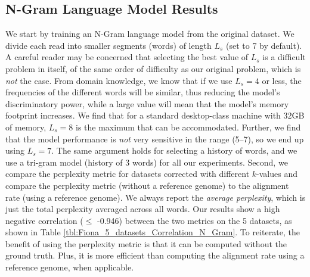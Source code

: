 \subsection{N-Gram Language Model Results}
\vspace{-5pt}
We start by training an N-Gram language model from the original dataset. We divide each read into smaller segments (words) of length $L_s$ (set to 7 by default). A careful reader may be concerned that selecting the best value of $L_s$ is a difficult problem in itself, of the same order of difficulty as our original problem, which is {\em not} the case. From domain knowledge, 
we know that if we use $L_s = 4$ or less, the frequencies of the different words will be similar, thus reducing the model's discriminatory power, while a large value will mean that the model's memory footprint increases. We find that for a standard desktop-class machine with 32GB of memory, $L_s = 8$ is the maximum that can be accommodated. Further, we find that the model performance is {\em not} very sensitive in the range (5--7), so we end up using $L_s = 7$. The same argument holds for selecting a history of words, and we use a tri-gram model (history of 3 words) for all our experiments.
Second, we compare the perplexity metric for datasets corrected with different $k$-values and compare the perplexity metric (without a reference genome) to the alignment rate (using a reference genome). 
We always report the \textit{average perplexity}, which is just the total perplexity averaged across all words.
Our results show a high negative correlation ($\leq$ -0.946) between the two  metrics on the 5 datasets, as shown in Table \ref{tbl:Fiona_5_datasets_Correlation_N_Gram}. %
To reiterate, the benefit of using the perplexity metric is that it can be computed without the ground truth. Plus, it is more efficient than computing the alignment rate using a reference genome, when applicable. 

